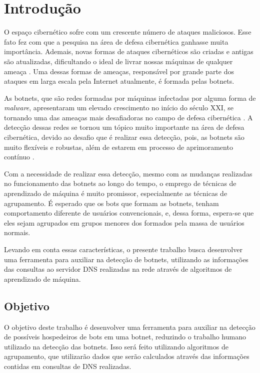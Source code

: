 \chapter{Introdução}
O espaço cibernético sofre com um crescente número de ataques maliciosos. Esse fato fez com que a pesquisa na área de defesa cibernética ganhasse muita importância. Ademais, novas formas de ataques cibernéticos são criadas e antigas são atualizadas, dificultando o ideal de livrar nossas máquinas de qualquer ameaça \citep{bharathula2016equitable}. Uma dessas formas de ameaças, responsável por grande parte dos ataques em larga escala pela Internet atualmente, é formada pelas botnets.

As botnets, que são redes formadas por máquinas infectadas por alguma forma de \textit{malware}, apresentaram um elevado crescimento no início do século XXI, se tornando uma das ameaças mais desafiadoras no campo de defesa cibernética \citep{chang2015measuring}. A detecção dessas redes se tornou um tópico muito importante na área de defesa cibernética, devido ao desafio que é realizar essa detecção, pois, as botnets são muito flexíveis e robustas, além de estarem em processo de aprimoramento contínuo \citep{bu2010new}.

Com a necessidade de realizar essa detecção, mesmo com as mudanças realizadas no funcionamento das botnets ao longo do tempo, o emprego de técnicas de aprendizado de máquina é muito promissor, especialmente as técnicas de agrupamento. É esperado que os bots que formam as botnets, tenham comportamento diferente de usuários convencionais, e, dessa forma, espera-se que eles sejam agrupados em grupos menores dos formados pela massa de usuários normais.

Levando em conta essas características, o presente trabalho busca desenvolver uma ferramenta para auxiliar na detecção de botnets, utilizando as informações das consultas ao servidor DNS realizadas na rede através de algoritmos de aprendizado de máquina.

\section{Objetivo}
O objetivo deste trabalho é desenvolver uma ferramenta para auxiliar na detecção de possíveis hospedeiros de bots em uma botnet, reduzindo o trabalho humano utilizado na detecção das botnets. Isso será feito utilizando algoritmos de agrupamento, que utilizarão dados que serão calculados através das informações contidas em consultas de DNS realizadas. 


